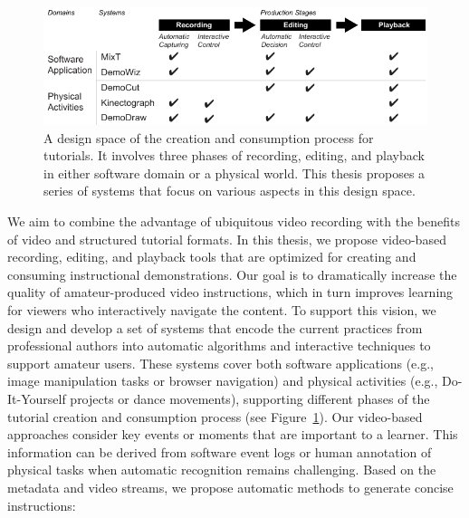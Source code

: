 \begin{figure}[t]
  \centering
  \includegraphics[width=1.0\columnwidth]{fig/space}
  \caption{A design space of the creation and consumption process for tutorials. It involves three phases of recording, editing, and playback in either software domain or a physical world. This thesis proposes a series of systems that focus on various aspects in this design space.}
  \label{fig:space}
\end{figure}

We aim to combine the advantage of ubiquitous video recording with the benefits of video and structured tutorial formats. In this thesis, we propose video-based recording, editing, and playback tools that are optimized for creating and consuming instructional demonstrations. Our goal is to dramatically increase the quality of amateur-produced video instructions, which in turn improves learning for viewers who interactively navigate the content. To support this vision, we design and develop a set of systems that encode the current practices from professional authors into automatic algorithms and interactive techniques to support amateur users. These systems cover both software applications (e.g., image manipulation tasks or browser navigation) and physical activities (e.g., Do-It-Yourself projects or dance movements), supporting different phases of the tutorial creation and consumption process (see Figure~\ref{fig:space}). Our video-based approaches consider key events or moments that are important to a learner. This information can be derived from software event logs or human annotation of physical tasks when automatic recognition remains challenging. Based on the metadata and video streams, we propose automatic methods to generate concise instructions:

